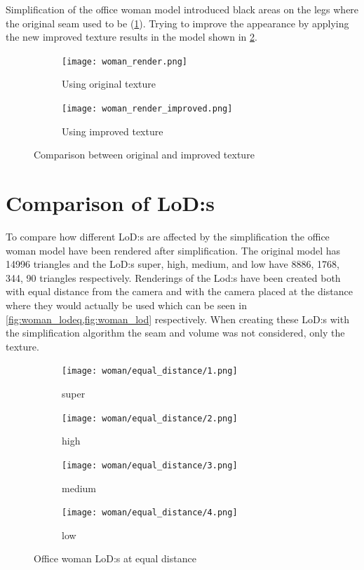 Simplification of the office woman model introduced black areas on the legs where the original seam used to be (\cref{fig:using_original_texture}). Trying to improve the appearance by applying the new improved texture results in the model shown in \cref{fig:using_improved_texture}.

\begin{figure}[ht]
  \centering
  \begin{subfigure}[b]{.15\textwidth}
    \texttt{[image: woman\_render.png]}
    \caption{Using original texture}
    \label{fig:using_original_texture}
  \end{subfigure}
  \qquad
  \begin{subfigure}[b]{.15\textwidth}
    \texttt{[image: woman\_render\_improved.png]}
    \caption{Using improved texture}
    \label{fig:using_improved_texture}
  \end{subfigure}
  \caption{Comparison between original and improved texture}
  \label{fig:texture_comparison}
\end{figure}

\clearpage

\section{Comparison of LoD:s}

To compare how different LoD:s are affected by the simplification the office woman model have been rendered after simplification. The original model has 14996 triangles and the LoD:s super, high, medium, and low have 8886, 1768, 344, 90 triangles respectively. Renderings of the Lod:s have been created both with equal distance from the camera and with the camera placed at the distance where they would actually be used which can be seen in \cref{fig:woman_lodeq,fig:woman_lod} respectively. When creating these LoD:s with the simplification algorithm the seam and volume was not considered, only the texture.

\begin{figure}[ht]
  \centering
  \begin{subfigure}[b]{.22\textwidth}
    \texttt{[image: woman/equal\_distance/1.png]}
    \caption{super}
    \label{fig:womaneq0}
  \end{subfigure}
  \begin{subfigure}[b]{.22\textwidth}
    \texttt{[image: woman/equal\_distance/2.png]}
    \caption{high}
    \label{fig:womaneq1}
  \end{subfigure}
  \centering
  \begin{subfigure}[b]{.22\textwidth}
    \texttt{[image: woman/equal\_distance/3.png]}
    \caption{medium}
    \label{fig:womaneq2}
  \end{subfigure}
  \begin{subfigure}[b]{.22\textwidth}
    \texttt{[image: woman/equal\_distance/4.png]}
    \caption{low}
    \label{fig:womaneq3}
  \end{subfigure}
  \caption{Office woman LoD:s at equal distance}
  \label{fig:woman_lodeq}
\end{figure}

